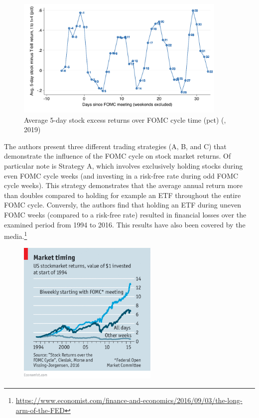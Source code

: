 \begin{figure}[h]
    \centering
    \label{cies19_fig1}
    \includegraphics[width=0.9\textwidth]{figures/cies19/fig1}
    \caption{Average 5-day stock excess returns over FOMC cycle time (pct) (\cite{cieslak_stock_2019}, 2019) }
\end{figure}

The authors present three different trading strategies (A, B, and C) that demonstrate the influence of the FOMC cycle on stock market returns.  Of particular note is Strategy A, which involves exclusively holding stocks during even FOMC cycle weeks (and investing in a risk-free rate during odd FOMC cycle weeks). This strategy demonstrates that the average annual return more than doubles compared to holding for example an ETF throughout the entire FOMC cycle.  Conversly, the authors find that holding an ETF during uneven FOMC weeks (compared to a risk-free rate) resulted in financial losses over the examined period from 1994 to 2016.  This results have also been covered by the media.\footnote{\url{https://www.economist.com/finance-and-economics/2016/09/03/the-long-arm-of-the-FED}}

\begin{figure}[h]
    \centering
     \label{FED_long_arm}
    \includegraphics[width=0.6\textwidth]{figures/20160903_FNC453.png}
    \caption{\cite{noauthor_long_2016}}
\end{figure}

